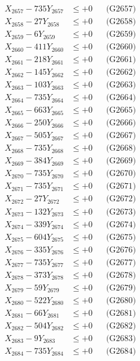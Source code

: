 \documentclass[a4paper,10pt]{article}
\begin{document}
{\begin{align}
X_{2657} - 735Y_{2657} &\leq +0 && \text{(G2657)} \\
X_{2658} - 27Y_{2658} &\leq +0 && \text{(G2658)} \\
X_{2659} - 6Y_{2659} &\leq +0 && \text{(G2659)} \\
X_{2660} - 411Y_{2660} &\leq +0 && \text{(G2660)} \\
\allowbreak
X_{2661} - 218Y_{2661} &\leq +0 && \text{(G2661)} \\
X_{2662} - 145Y_{2662} &\leq +0 && \text{(G2662)} \\
X_{2663} - 103Y_{2663} &\leq +0 && \text{(G2663)} \\
X_{2664} - 735Y_{2664} &\leq +0 && \text{(G2664)} \\
X_{2665} - 663Y_{2665} &\leq +0 && \text{(G2665)} \\
X_{2666} - 250Y_{2666} &\leq +0 && \text{(G2666)} \\
X_{2667} - 505Y_{2667} &\leq +0 && \text{(G2667)} \\
X_{2668} - 735Y_{2668} &\leq +0 && \text{(G2668)} \\
X_{2669} - 384Y_{2669} &\leq +0 && \text{(G2669)} \\
X_{2670} - 735Y_{2670} &\leq +0 && \text{(G2670)} \\
\allowbreak
X_{2671} - 735Y_{2671} &\leq +0 && \text{(G2671)} \\
X_{2672} - 27Y_{2672} &\leq +0 && \text{(G2672)} \\
X_{2673} - 132Y_{2673} &\leq +0 && \text{(G2673)} \\
X_{2674} - 339Y_{2674} &\leq +0 && \text{(G2674)} \\
X_{2675} - 604Y_{2675} &\leq +0 && \text{(G2675)} \\
X_{2676} - 335Y_{2676} &\leq +0 && \text{(G2676)} \\
X_{2677} - 735Y_{2677} &\leq +0 && \text{(G2677)} \\
X_{2678} - 373Y_{2678} &\leq +0 && \text{(G2678)} \\
X_{2679} - 59Y_{2679} &\leq +0 && \text{(G2679)} \\
X_{2680} - 522Y_{2680} &\leq +0 && \text{(G2680)} \\
\allowbreak
X_{2681} - 66Y_{2681} &\leq +0 && \text{(G2681)} \\
X_{2682} - 504Y_{2682} &\leq +0 && \text{(G2682)} \\
X_{2683} - 9Y_{2683} &\leq +0 && \text{(G2683)} \\
X_{2684} - 735Y_{2684} &\leq +0 && \text{(G2684)} \\

\end{align}}
\end{document}
